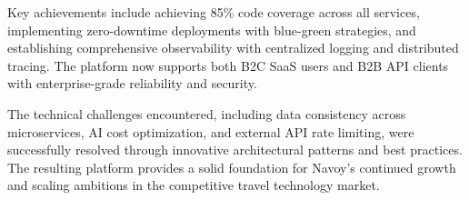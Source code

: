 Key achievements include achieving 85\% code coverage across all services, implementing zero-downtime deployments with blue-green strategies, and establishing comprehensive observability with centralized logging and distributed tracing. The platform now supports both B2C SaaS users and B2B API clients with enterprise-grade reliability and security.

The technical challenges encountered, including data consistency across microservices, AI cost optimization, and external API rate limiting, were successfully resolved through innovative architectural patterns and best practices. The resulting platform provides a solid foundation for Navoy's continued growth and scaling ambitions in the competitive travel technology market.
